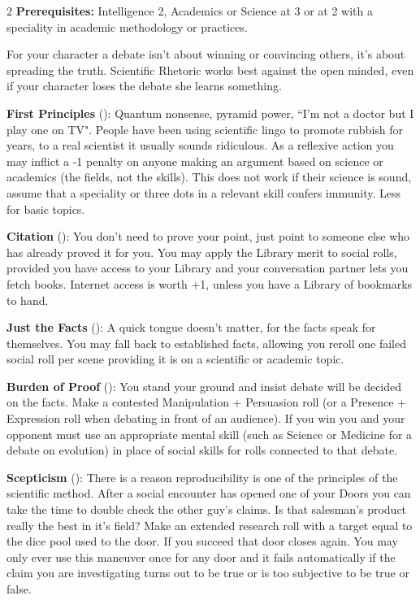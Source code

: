 \begin{multicols}{2}
\textbf{Prerequisites:} Intelligence 2, Academics or Science at 3 or at 2 with a speciality in academic methodology or practices.

For your character a debate isn't about winning or convincing others, it's about spreading the truth. Scientific Rhetoric works best against the open minded, even if your character loses the debate she learns something.

\textbf{First Principles} (\textbullet): Quantum nonsense, pyramid power, \textquotedblleft I'm not a doctor but I play one on TV". People have been using scientific lingo to promote rubbish for years, to a real scientist it usually sounds ridiculous. As a reflexive action you may inflict a -1 penalty on anyone making an argument based on science or academics (the fields, not the skills). This does not work if their science is sound, assume that a speciality or three dots in a relevant skill confers immunity. Less for basic topics.

\textbf{Citation} (\textbullet\textbullet): You don't need to prove your point, just point to someone else who has already proved it for you. You may apply the Library merit to social rolls, provided you have access to your Library and your conversation partner lets you fetch books. Internet access is worth +1, unless you have a Library of bookmarks to hand.

\textbf{Just the Facts} (\textbullet\textbullet\textbullet): A quick tongue doesn't matter, for the facts speak for themselves. You may fall back to established facts, allowing you reroll one failed social roll per scene providing it is on a scientific or academic topic.

\textbf{Burden of Proof} (\textbullet\textbullet\textbullet\textbullet): You stand your ground and insist debate will be decided on the facts. Make a contested Manipulation + Persuasion roll (or a Presence + Expression roll when debating in front of an audience). If you win you and your opponent must use an appropriate mental skill (such as Science or Medicine for a debate on evolution) in place of social skills for rolls connected to that debate.

\textbf{Scepticism} (\textbullet\textbullet\textbullet\textbullet\textbullet): There is a reason reproducibility is one of the principles of the scientific method. After a social encounter has opened one of your Doors you can take the time to double check the other guy's claims. Is that salesman's product really the best in it's field? Make an extended research roll with a target equal to the dice pool used to the door. If you succeed that door closes again. You may only ever use this maneuver once for any door and it fails automatically if the claim you are investigating turns out to be true or is too subjective to be true or false.



\end{multicols}
